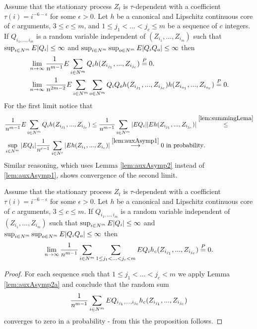 \begin{lemma}
\label{lem:auxAsymp2a}
Assume that the stationary process $Z_t$ is $\tau$-dependent with a coefficient $\tau(i) = i^{-6-\epsilon}$ for some $\epsilon>0$. Let $h$ be a canonical and Lipschitz continuous core of $c$ arguments, $3 \leq c \leq m$, and $1 \leq j_1 < ...<j_c \leq m$ be a sequence of $c$ integers. If $Q_{i_1,...,i_m}$ is a random variable independent of $(Z_{i_1},...,Z_{i_m})$ such that $\sup_{i \in N^m} E |Q_i| \leq \infty$ and $\sup_{i \in N^{m}} \sup_{o \in N^m} E |Q_i Q_o| \leq \infty$  then 
\begin{align}
&\lim_{n \to \infty}\frac{1} {n^{m-1}} E  \sum_{i \in N^{m}}  Q_i h(Z_{i_{j_1}},...,Z_{i_{j_c}}) \overset{P}{=} 0. \\
&\lim_{n \to \infty}\frac{1} {n^{2m-2}} E  \sum_{i \in N^{m}} \sum_{o \in N^{m}}  Q_i Q_o h(Z_{i_{j_1}},...,Z_{i_{j_c}}) h(Z_{i_{o_1}},...,Z_{i_{o_c}}) \overset{P}{=} 0. \\
\end{align}
For the first limit notice  that 
\begin{align}
&\frac{1} {n^{m-1}} E  \sum_{i \in N^{m}}  Q_i h(Z_{i_{j_1}},...,Z_{i_{j_c}}) \leq  \frac{1} {n^{m-1}}  \sum_{i \in N^{m}}  |E Q_i| |E h(Z_{i_{j_1}},...,Z_{i_{j_c}})| \overset{ \ref{lem:summingLema}}{\leq} \\
& \sup_{i \in N^m} |E Q_i|   \frac{1} {n^{c-1}}  \sum_{i \in N^c} |E h(Z_{i_1},...,Z_{i_c})| \overset{\ref{lem:auxAsymp1}}{\longrightarrow} 0 \text{  in probability}. 
\end{align}
Similar reasoning, which uses Lemma \ref{lem:auxAsymp2} instead of \ref{lem:auxAsymp1}, shows convergence of the second limit. 
\end{lemma}


\begin{lemma}
\label{lem:higherVstats}
Assume that the stationary process $Z_t$ is $\tau$-dependent with a coefficient $\tau(i) = i^{-6-\epsilon}$ for some $\epsilon>0$. Let $h$ be a canonical and Lipschitz continuous core of $c$ arguments, $3 \leq c \leq m$. If $Q_{i_1,...,i_m}$ is a random variable independent of $(Z_{i_1},...,Z_{i_m})$ such that $\sup_{i \in N^m} E |Q_i| \leq \infty$ and $\sup_{i \in N^{m}} \sup_{o \in N^m} E |Q_i Q_o| \leq \infty$  then 
\begin{align}
\lim_{n \to \infty} \frac {1} {n^{m-1}} \sum_{i \in N^m}  \sum_{1 \leq j_1<...<j_c < m} E Q_i   h_c(Z_{i_{j_1}},...,Z_{i_{j_c}}) \overset{P}{=} 0.
\end{align}
\end{lemma}
\begin{proof}
For each sequence such that  $1 \leq j_1<...<j_c < m$  we apply Lemma \ref{lem:auxAsymp2a} and  conclude that the random sum 
\begin{align}
\frac {1} {n^{m-1}} \sum_{i \in N^m} E Q_{i_{j_1},...,i_{j_c}}   h_c(Z_{i_{j_1}},...,Z_{i_{j_c}})
\end{align}
converges to zero in a probability - from this the proposition follows.
\end{proof}


